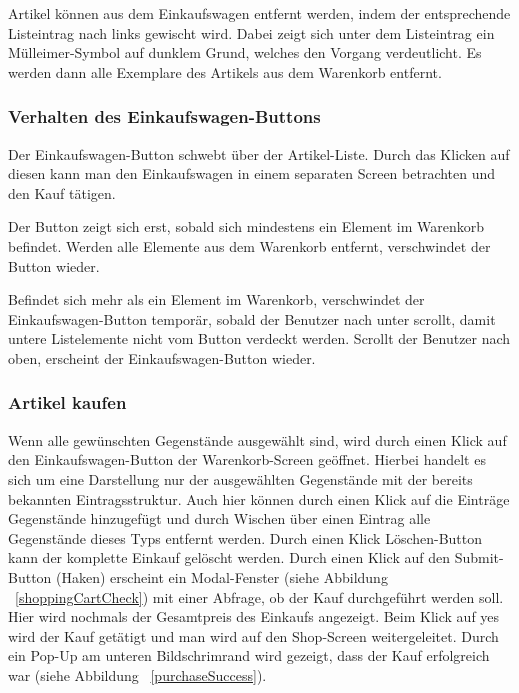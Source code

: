 Artikel können aus dem Einkaufswagen entfernt werden, indem der entsprechende Listeintrag nach links gewischt wird.
Dabei zeigt sich unter dem Listeintrag ein Mülleimer-Symbol auf dunklem Grund, welches den Vorgang verdeutlicht.
Es werden dann alle Exemplare des Artikels aus dem Warenkorb entfernt.

\subsubsection{Verhalten des Einkaufswagen-Buttons} \label{subsubsec:shoppingcart-button}

Der Einkaufswagen-Button schwebt über der Artikel-Liste.
Durch das Klicken auf diesen kann man den Einkaufswagen in einem separaten Screen betrachten und den Kauf tätigen.

Der Button zeigt sich erst, sobald sich mindestens ein Element im Warenkorb befindet.
Werden alle Elemente aus dem Warenkorb entfernt, verschwindet der Button wieder.

Befindet sich mehr als ein Element im Warenkorb, verschwindet der Einkaufswagen-Button temporär, sobald der Benutzer nach unter scrollt, damit untere Listelemente nicht vom Button verdeckt werden.
Scrollt der Benutzer nach oben, erscheint der Einkaufswagen-Button wieder.

\subsubsection{Artikel kaufen} \label{subsubsec:shop-buy}

Wenn alle gewünschten Gegenstände ausgewählt sind, wird durch einen Klick auf den Einkaufswagen-Button der Warenkorb-Screen geöffnet.
Hierbei handelt es sich um eine Darstellung nur der ausgewählten Gegenstände mit der bereits bekannten Eintragsstruktur.
Auch hier können durch einen Klick auf die Einträge Gegenstände hinzugefügt und durch Wischen über einen Eintrag alle Gegenstände dieses Typs entfernt werden.
Durch einen Klick Löschen-Button kann der komplette Einkauf gelöscht werden.
Durch einen Klick auf den Submit-Button (Haken) erscheint ein Modal-Fenster (siehe Abbildung ~\ref{shoppingCartCheck}) mit einer Abfrage, ob der Kauf durchgeführt werden soll.
Hier wird nochmals der Gesamtpreis des Einkaufs angezeigt.
Beim Klick auf \glqq yes\grqq{} wird der Kauf getätigt und man wird auf den Shop-Screen weitergeleitet.
Durch ein Pop-Up am unteren Bildschrimrand wird gezeigt, dass der Kauf erfolgreich war (siehe Abbildung ~\ref{purchaseSuccess}).

